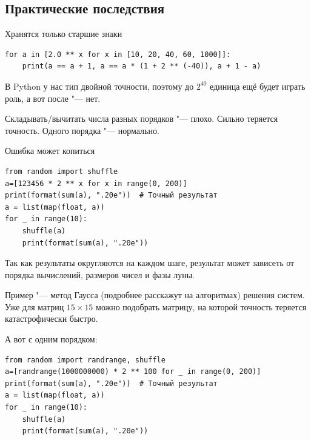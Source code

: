 \subsection{Практические последствия}

\begin{frame}
\end{frame}

\begin{frame}[fragile]{Хранятся только старшие знаки}
\begin{verbatim}
for a in [2.0 ** x for x in [10, 20, 40, 60, 1000]]:
    print(a == a + 1, a == a * (1 + 2 ** (-40)), a + 1 - a)
\end{verbatim}
	В Python у нас тип двойной точности, поэтому до $2^{40}$ единица ещё будет играть роль, а вот после "--- нет.

	Складывать/вычитать числа разных порядков "--- плохо.
	Сильно теряется точность.
	Одного порядка "--- нормально.

\end{frame}

\begin{frame}[fragile]{Ошибка может копиться}
\begin{verbatim}
from random import shuffle
a=[123456 * 2 ** x for x in range(0, 200)]
print(format(sum(a), ".20e"))  # Точный результат
a = list(map(float, a))
for _ in range(10):
    shuffle(a)
    print(format(sum(a), ".20e"))
\end{verbatim}
	Так как результаты округляются на каждом шаге, результат может зависеть от порядка вычислений, размеров чисел и фазы луны.

	Пример "--- метод Гаусса (подробнее расскажут на алгоритмах) решения систем.
	Уже для матриц $15 \times 15$ можно подобрать матрицу, на которой точность теряется катастрофически быстро.

	А вот с одним порядком:
\begin{verbatim}
from random import randrange, shuffle
a=[randrange(1000000000) * 2 ** 100 for _ in range(0, 200)]
print(format(sum(a), ".20e"))  # Точный результат
a = list(map(float, a))
for _ in range(10):
    shuffle(a)
    print(format(sum(a), ".20e"))
\end{verbatim}
\end{frame}

